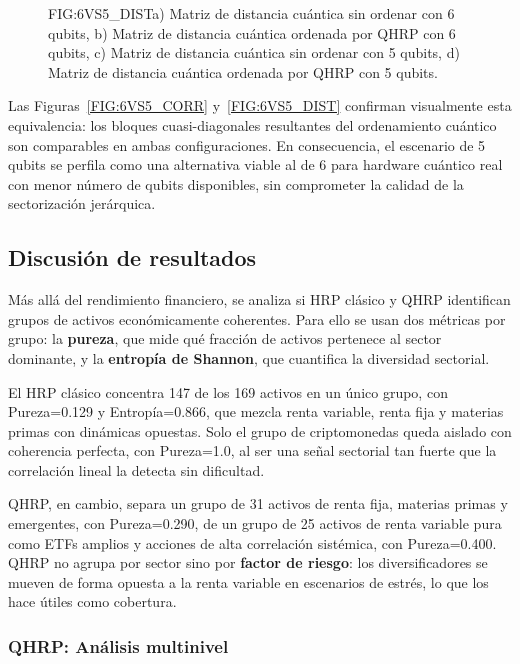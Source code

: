 \begin{figure}[Matrices de distancia cuántica 6 vs 5 qubits]{FIG:6VS5_DIST}{a) Matriz de distancia cuántica sin ordenar con 6 qubits, b) Matriz de distancia cuántica ordenada por QHRP con 6 qubits, c) Matriz de distancia cuántica sin ordenar con 5 qubits, d) Matriz de distancia cuántica ordenada por QHRP con 5 qubits.}
\end{figure}

Las Figuras~\ref{FIG:6VS5_CORR} y~\ref{FIG:6VS5_DIST} confirman visualmente esta equivalencia: los bloques cuasi-diagonales resultantes del ordenamiento cuántico son comparables en ambas configuraciones. En consecuencia, el escenario de 5 qubits se perfila como una alternativa viable al de 6 para hardware cuántico real con menor número de qubits disponibles, sin comprometer la calidad de la sectorización jerárquica.

\subsection{Discusión de resultados}
\label{subsec:discusion_resultados}

Más allá del rendimiento financiero, se analiza si \gls{HRP} clásico y \gls{QHRP} identifican grupos de activos económicamente coherentes. Para ello se usan dos métricas por grupo: la \textbf{pureza}, que mide qué fracción de activos pertenece al sector dominante, y la \textbf{entropía de Shannon}, que cuantifica la diversidad sectorial.

El HRP clásico concentra 147 de los 169 activos en un único grupo, con Pureza=0.129 y Entropía=0.866, que mezcla renta variable, renta fija y materias primas con dinámicas opuestas. Solo el grupo de criptomonedas queda aislado con coherencia perfecta, con Pureza=1.0, al ser una señal sectorial tan fuerte que la correlación lineal la detecta sin dificultad.

\gls{QHRP}, en cambio, separa un grupo de 31 activos de renta fija, materias primas y emergentes, con Pureza=0.290, de un grupo de 25 activos de renta variable pura como ETFs amplios y acciones de alta correlación sistémica, con Pureza=0.400. \gls{QHRP} no agrupa por sector sino por \textbf{factor de riesgo}: los diversificadores se mueven de forma opuesta a la renta variable en escenarios de estrés, lo que los hace útiles como cobertura.

\subsubsection{QHRP: Análisis multinivel}
\label{subsubsec:analisis_multinivel}

